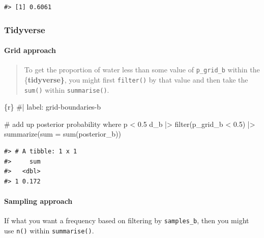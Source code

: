 \documentclass[
  letterpaper,
  DIV=11,
  numbers=noendperiod]{scrreprt}
\let\oldparagraph\paragraph
\renewcommand{\paragraph}[1]{\oldparagraph{#1}\mbox{}}
\newenvironment{Shaded}{\begin{snugshade}}{\end{snugshade}}
\newcommand{\AttributeTok}[1]{\textcolor[rgb]{0.40,0.45,0.13}{#1}}
\newcommand{\CommentTok}[1]{\textcolor[rgb]{0.37,0.37,0.37}{#1}}
\newcommand{\FloatTok}[1]{\textcolor[rgb]{0.68,0.00,0.00}{#1}}
\newcommand{\FunctionTok}[1]{\textcolor[rgb]{0.28,0.35,0.67}{#1}}
\newcommand{\InformationTok}[1]{\textcolor[rgb]{0.37,0.37,0.37}{#1}}
\newcommand{\NormalTok}[1]{\textcolor[rgb]{0.00,0.23,0.31}{#1}}
\newcommand{\SpecialCharTok}[1]{\textcolor[rgb]{0.37,0.37,0.37}{#1}}
\begin{document}
\begin{verbatim}
#> [1] 0.6061
\end{verbatim}

\hypertarget{tidyverse-11}{%
\subsubsection{Tidyverse}\label{tidyverse-11}}

\hypertarget{grid-approach-1}{%
\paragraph{Grid approach}\label{grid-approach-1}}

\begin{quote}
To get the proportion of water less than some value of
\texttt{p\_grid\_b} within the \{\textbf{tidyverse\}}, you might first
\texttt{filter()} by that value and then take the \texttt{sum()} within
\texttt{summarise()}.
\end{quote}

\begin{Shaded}
\begin{Highlighting}[]
\InformationTok{\textasciigrave{}\textasciigrave{}\textasciigrave{}\{r\}}
\CommentTok{\#| label: grid{-}boundaries{-}b}

\CommentTok{\# add up posterior probability where p \textless{} 0.5}
\NormalTok{d\_b }\SpecialCharTok{|\textgreater{}} \FunctionTok{filter}\NormalTok{(p\_grid\_b }\SpecialCharTok{\textless{}} \FloatTok{0.5}\NormalTok{) }\SpecialCharTok{|\textgreater{}} 
    \FunctionTok{summarize}\NormalTok{(}\AttributeTok{sum =} \FunctionTok{sum}\NormalTok{(posterior\_b))}
\InformationTok{\textasciigrave{}\textasciigrave{}\textasciigrave{}}
\end{Highlighting}
\end{Shaded}

\begin{verbatim}
#> # A tibble: 1 x 1
#>     sum
#>   <dbl>
#> 1 0.172
\end{verbatim}

\hypertarget{sampling-approach-1}{%
\paragraph{Sampling approach}\label{sampling-approach-1}}

If what you want a frequency based on filtering by \texttt{samples\_b},
then you might use \texttt{n()} within \texttt{summarise()}.
\end{document}
